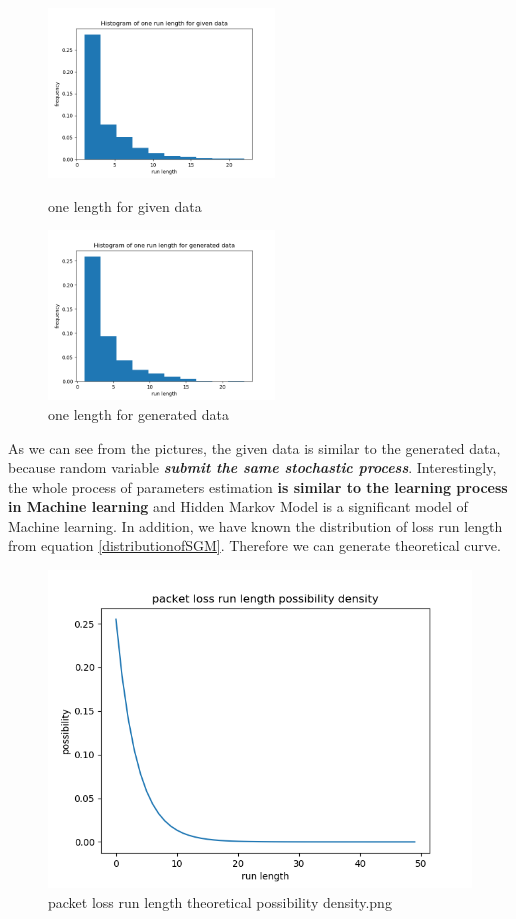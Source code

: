 \documentclass[11pt]{article}
\begin{document}
\begin{figure}[htbp]
    \centering
    \begin{minipage}[t]{0.48\textwidth}
    \centering
    \includegraphics[width=6cm]{Histogram_of_one_run_length_for_given_data.png}
    \caption{one length for given data}
    \end{minipage}
    \begin{minipage}[t]{0.48\textwidth}
    \centering
    \includegraphics[width=6cm]{Histogram_of_one_run_length_for_generated_data.png}
    \caption{one length for generated data}
    \end{minipage}
\end{figure}
As we can see from the pictures, the given data is similar to the generated data, because random variable \textbf{\emph{submit the same stochastic process}}. 
Interestingly, the whole process of parameters estimation \textbf{is similar to the learning process in Machine learning} and Hidden Markov Model is a significant model of Machine learning.
In addition, we have known the distribution of loss run length from equation \ref{distributionofSGM}. 
Therefore we can generate theoretical curve. 
\begin{figure}[ht]
    \centering
    \includegraphics[scale = 0.6]{packet_loss_run_length_possibility_density.png}
    \caption{packet loss run length theoretical possibility density.png}
    \label{SGMTD}
\end{figure}
\end{document}
